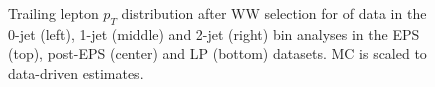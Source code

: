 \begin{figure}[!hbtp]
\caption{
Trailing lepton $p_T$ distribution after WW selection for \lpintlumi of data in the 0-jet (left), 
1-jet (middle) and 2-jet (right) bin analyses in the EPS (top), post-EPS (center) and LP (bottom) datasets.
MC is scaled to data-driven estimates.
}
\label{fig:ww_ptmin_lp}
\end{figure}

\clearpage
